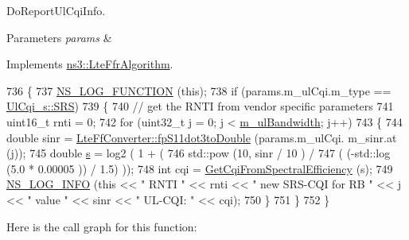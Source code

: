 Do\+Report\+Ul\+Cqi\+Info. 


\begin{DoxyParams}{Parameters}
{\em params} & \\
\hline
\end{DoxyParams}


Implements \hyperlink{classns3_1_1LteFfrAlgorithm_a7047b2f2fbd76637bb5623fba4c73630}{ns3\+::\+Lte\+Ffr\+Algorithm}.


\begin{DoxyCode}
736 \{
737   \hyperlink{log-macros-disabled_8h_a90b90d5bad1f39cb1b64923ea94c0761}{NS\_LOG\_FUNCTION} (\textcolor{keyword}{this});
738   \textcolor{keywordflow}{if} (params.m\_ulCqi.m\_type == \hyperlink{structns3_1_1UlCqi__s_aece9e5ebea42eb9ff1744c72c8459b57af4b6dba4243636562c910c4d4761dd7e}{UlCqi\_s::SRS})
739     \{
740       \textcolor{comment}{// get the RNTI from vendor specific parameters}
741       uint16\_t rnti = 0;
742       \textcolor{keywordflow}{for} (uint32\_t j = 0; j < \hyperlink{classns3_1_1LteFfrAlgorithm_acfa0105633ee5c27538c3309eb132d21}{m\_ulBandwidth}; j++)
743         \{
744           \textcolor{keywordtype}{double} sinr = \hyperlink{classns3_1_1LteFfConverter_aa5d8c2a8f988dbd63da91818c18666eb}{LteFfConverter::fpS11dot3toDouble} (params.m\_ulCqi.
      m\_sinr.at (j));
745           \textcolor{keywordtype}{double} \hyperlink{generate__test__data__lte__sinr_8m_ad83eeb3a142285d1243a08c6b7026df8}{s} = log2 ( 1 + (
746                               std::pow (10, sinr / 10 )  /
747                               ( (-std::log (5.0 * 0.00005 )) / 1.5) ));
748           \textcolor{keywordtype}{int} cqi = \hyperlink{classns3_1_1LteFfrEnhancedAlgorithm_aa72c07ec45c605f8d44d751e9b9b6280}{GetCqiFromSpectralEfficiency} (s);
749           \hyperlink{group__logging_gafbd73ee2cf9f26b319f49086d8e860fb}{NS\_LOG\_INFO} (\textcolor{keyword}{this} << \textcolor{stringliteral}{" RNTI "} << rnti << \textcolor{stringliteral}{" new SRS-CQI for RB  "} << j << \textcolor{stringliteral}{" value "} << 
      sinr << \textcolor{stringliteral}{" UL-CQI: "} << cqi);
750         \}
751     \}
752 \}
\end{DoxyCode}


Here is the call graph for this function\+:


